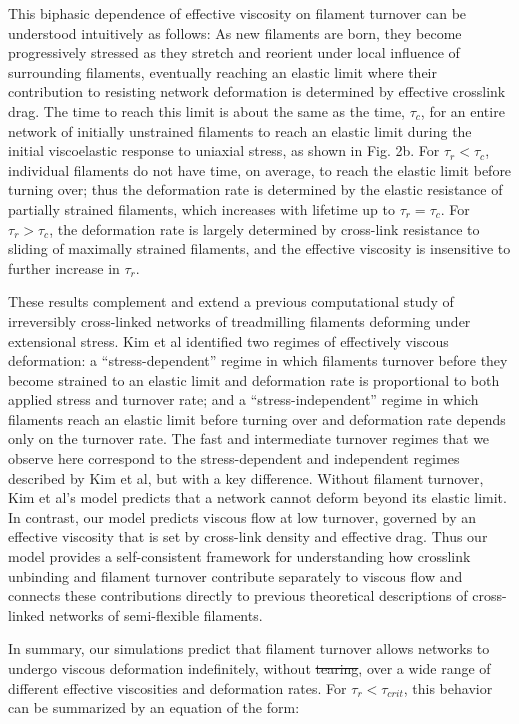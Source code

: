 \documentclass[10pt,letterpaper]{article}
\providecommand{\DIFaddtex}[1]{{\protect\color{blue}\uwave{#1}}} %
\providecommand{\DIFdeltex}[1]{{\protect\color{red}\sout{#1}}}                      %
\providecommand{\DIFaddbegin}{} %
\providecommand{\DIFaddend}{} %
\providecommand{\DIFdelbegin}{} %
\providecommand{\DIFdelend}{} %
\providecommand{\DIFadd}[1]{\texorpdfstring{\DIFaddtex{#1}}{#1}} %
\providecommand{\DIFdel}[1]{\texorpdfstring{\DIFdeltex{#1}}{}} %
\begin{document}
This biphasic dependence of effective viscosity on filament turnover can be understood intuitively as follows:  As new filaments are born, they become progressively stressed as they stretch and reorient under local influence of surrounding filaments, eventually reaching an elastic limit where their contribution to resisting network deformation is determined by effective crosslink drag.  The time to reach this limit is about the same as the time, $\tau_c$, for an entire network of initially unstrained filaments to reach an elastic limit during the initial viscoelastic response to uniaxial stress, as shown in Fig. 2b.  For $\tau_r < \tau_c$, individual filaments do not have time, on average, to reach the elastic limit before turning over; thus the deformation rate is determined by the elastic resistance of partially strained filaments, which increases with lifetime up to $\tau_r = \tau_c$. For $\tau_r > \tau_c$, the deformation rate is largely determined by cross-link resistance to sliding of maximally strained filaments, and the effective viscosity is insensitive to further increase in  $\tau_r$.

These results complement and extend a previous computational study of irreversibly cross-linked networks of treadmilling filaments deforming under extensional stress\cite{Kim2014526}. Kim et al identified two regimes of effectively viscous deformation: a ``stress-dependent'' regime in which filaments turnover before they become strained to an elastic limit and deformation rate is proportional to both applied stress and turnover rate; and a ``stress-independent'' regime in which filaments reach an elastic limit before turning over and deformation rate depends only on the turnover rate. The fast and intermediate turnover regimes that we observe here correspond to the stress-dependent and independent regimes described by Kim et al, but with a key difference. Without filament turnover, Kim et al's model predicts that a network cannot deform beyond its elastic limit.  In contrast, our model predicts viscous flow at low turnover, governed by an effective viscosity that is set by cross-link density and effective drag. Thus our model provides a self-consistent framework for understanding how crosslink unbinding and filament turnover contribute separately to viscous flow and connects these contributions directly to previous theoretical descriptions of cross-linked networks of semi-flexible filaments. 

In summary, our simulations predict that filament turnover allows networks to undergo viscous deformation indefinitely, without \DIFdelbegin \DIFdel{tearing}\DIFdelend \DIFaddbegin \DIFadd{loss of connectivity or material failure}\DIFaddend , over a wide range of different effective viscosities and deformation rates. For $\tau_r < \tau_{crit}$, this behavior can be summarized by an equation of the form:
\end{document}
